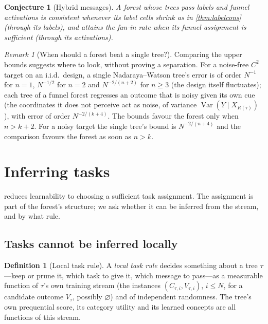 \documentclass[11pt]{article}
\newtheorem{conjecture}[theorem]{Conjecture}
\theoremstyle{definition}
\newtheorem{definition}[theorem]{Definition}
\theoremstyle{remark}
\newtheorem{remark}[theorem]{Remark}
\newcommand{\Var}{\operatorname{Var}}
\begin{document}
\begin{conjecture}[Hybrid messages]\label{conj:hybrid}
A forest whose trees pass labels and funnel activations is consistent whenever its
label cells shrink as in \cref{thm:labelcons} (through its labels), and attains the
fan-in rate when its funnel assignment is sufficient (through its activations).
\end{conjecture}

\begin{remark}[When should a forest beat a single tree?]\label{rem:crossover}
Comparing the upper bounds suggests where to look, without proving a separation.  For a
noise-free $C^2$ target on an i.i.d.\ design, a single Nadaraya--Watson tree's error is of
order $N^{-1}$ for $n=1$, $N^{-1/2}$ for $n=2$ and $N^{-2/(n+2)}$ for $n\ge3$ (the design
itself fluctuates); each tree of a funnel forest regresses an outcome that is noisy given
its own cue (the coordinates it does not perceive act as noise, of variance
$\Var(Y\mid X_{R(\tau)})$), with error of order $N^{-2/(k+4)}$.  The bounds favour the
forest only when $n>k+2$.  For a noisy target the single tree's bound is $N^{-2/(n+4)}$
and the comparison favours the forest as soon as $n>k$.
\end{remark}

\section{Inferring tasks}\label{sec:infer}

 reduces learnability to choosing a sufficient task assignment.  The
assignment is part of the forest's structure; we ask whether it can be inferred from the
stream, and by what rule.

\subsection{Tasks cannot be inferred locally}

\begin{definition}[Local task rule]\label{def:local}
A \emph{local task rule} decides something about a tree $\tau$---keep or prune it,
which task to give it, which message to pass---as a measurable function of $\tau$'s own
training stream (the instances $(C_{\tau,i},V_{\tau,i})$, $i\le N$, for a candidate
outcome $V_\tau$, possibly $\varnothing$) and of independent randomness.  The tree's own
prequential score, its category utility and its learned concepts are all functions of
this stream.
\end{definition}
\end{document}
